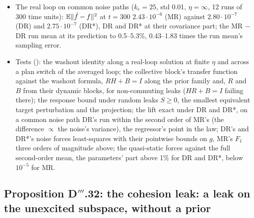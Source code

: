 \begin{itemize}
    $1.4\cdot10^{-14}$, $HR+B-I$ 0.47--0.79.
  \item The real loop on common noise paths ($k_e=25$, std 0.01, $\eta=\infty$, 12 runs of 300 time units):
    $\mathbb{E}\lVert \hat f-f\rVert^2$ at $t=300$ $2.43\cdot10^{-6}$ (MR) against $2.80\cdot10^{-7}$ (DR) and $2.75\cdot10^{-7}$
    (DR*), DR and DR* at their covariance part; the MR $-$ DR run mean at its prediction to 0.5--5.3\%, 0.43--1.83
    times the run mean's sampling error.
  \item Tests (): the washout identity along a real-loop solution at finite $\eta$ and
    across a plan switch of the averaged loop; the collective block's transfer function against the washout formula,
    $RH+B=I$ along the prior family and, $R$ and $B$ from their dynamic blocks, for non-commuting leaks ($HR+B=I$
    failing there); the response bound under random leaks $S\ge0$, the smallest equivalent target perturbation and the
    projection; the lift exact under DR and DR*, on a common noise path DR's run within the second order of MR's (the
    difference $\propto$ the noise's variance), the regressor's point in the law; DR's and DR*'s noise forces
    least-squares with their pointwise bounds on $g$, MR's $F_1$ three orders of magnitude above; the quasi-static
    forces against the full second-order mean, the parameters' part above 1\% for DR and DR*, below $10^{-5}$ for MR.
\end{itemize}

\subsection{Proposition D\texorpdfstring{$'''$}{'''}.32: the cohesion leak: a leak on the unexcited subspace, without
a prior}

